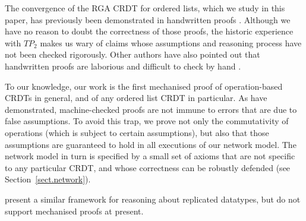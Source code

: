 The convergence of the RGA CRDT for ordered lists, which we study in this paper, has previously been
demonstrated in handwritten proofs \cite{Attiya:2016kh,Kleppmann:2016ve,Roh:2009ws}. Although we
have no reason to doubt the correctness of those proofs, the historic experience with
$\mathit{TP}_2$ makes us wary of claims whose assumptions and reasoning process have not been
checked rigorously. Other authors have also pointed out that handwritten proofs are laborious and
difficult to check by hand \cite{Li:2008hw,Li:2005jq}.

To our knowledge, our work is the first mechanised proof of operation-based CRDTs in general, and of
any ordered list CRDT in particular. As \citet{Oster:2005vi} have demonstrated, machine-checked
proofs are not immune to errors that are due to false assumptions. To avoid this trap, we prove not
only the commutativity of operations (which is subject to certain assumptions), but also that those
assumptions are guaranteed to hold in all executions of our network model. The network model in turn
is specified by a small set of axioms that are not specific to any particular CRDT, and whose
correctness can be robustly defended (see Section~\ref{sect.network}).

\citet{Burckhardt:2014ft} present a similar framework for reasoning about replicated datatypes, but
do not support mechanised proofs at present.
